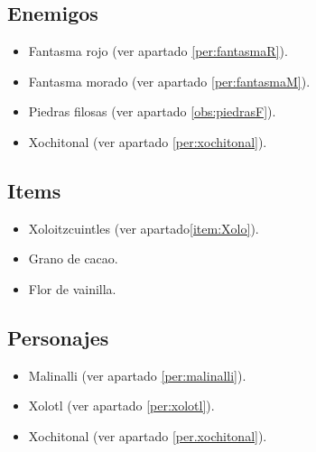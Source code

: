 	\subsection{Enemigos}
	\begin{itemize}
		\item Fantasma rojo (ver apartado \ref{per:fantasmaR}).
			
		\item Fantasma morado (ver apartado \ref{per:fantasmaM}).
			
		\item Piedras filosas (ver apartado \ref{obs:piedrasF}).
		\item Xochitonal (ver apartado \ref{per:xochitonal}).
			
	\end{itemize}
	\subsection{Items}
	\begin{itemize}
		\item Xoloitzcuintles (ver apartado\ref{item:Xolo}).
		\item Grano de cacao.
		\item Flor de vainilla.
	\end{itemize}
	\subsection{Personajes}
	\begin{itemize}
		\item Malinalli (ver apartado \ref{per:malinalli}).
		\item Xolotl (ver apartado \ref{per:xolotl}).
			
		\item Xochitonal (ver apartado \ref{per.xochitonal}).
	\end{itemize}
	
